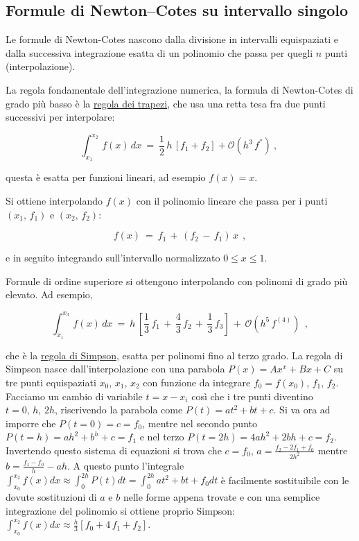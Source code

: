 \documentclass{article}
\begin{document}
	
	
	\subsection{Formule di Newton–Cotes su intervallo singolo}
	
	Le formule di Newton-Cotes nascono dalla divisione in intervalli equispaziati e dalla successiva integrazione esatta di un polinomio che passa per quegli $n$ punti (interpolazione).
	
	La regola fondamentale dell'integrazione numerica, la formula di Newton-Cotes di grado più basso è la \underline{regola dei trapezi}, che usa una retta tesa fra due punti successivi per interpolare:
	
	\begin{equation}
		\label{trapezoidal-rule}
		\int_{x_1}^{x_2}\, f(x)\, dx\ =\
		\frac{1}{2}\, h \, [f_1 + f_2] + \mathcal{O}(h^3\, f^{''})\ ,\
	\end{equation}  
	
	questa è esatta per funzioni lineari, ad esempio $f(x)=x$. 
	
	Si ottiene interpolando $f(x)$ con il polinomio lineare che passa per i punti $(x_1,\, f_1)$ e $(x_2,\, f_2)$:
	
	\[ f(x)\ =\ f_1\, +\, (f_2\, -\, f_1)\, x\ \ , \]
	
	e in seguito integrando sull'intervallo normalizzato $0 \le x \le 1$.
	
	Formule di ordine superiore si ottengono interpolando con polinomi di grado più elevato. Ad esempio,
	
	\begin{equation}\label{Simpson's rule}
		\int_{x_1}^{x_3}\, f(x)\, dx\ =\ h\, \left[
		\frac{1}{3}\, f_1\, +\, \frac{4}{3}\, f_2\, +\, \frac{1}{3}\, f_3\right]\, +\,	\mathcal{O}(h^5\, f^{(4)})\ \ ,
	\end{equation} 
	
	che è la \underline{regola di Simpson}, esatta per polinomi fino al terzo grado.
	La regola di Simpson nasce dall'interpolazione con una parabola $P(x)=Ax^x + Bx+C$ su tre punti equispaziati $x_0$, $x_1$, $x_2$ con funzione da integrare $f_0=f(x_0)$, $f_1$, $f_2$. Facciamo un cambio di variabile $t=x-x_i$ così che i tre punti diventino $t=0,\, h,\, 2h$, riscrivendo la parabola come $P(t)=at^2+bt+c$. Si va ora ad imporre che $P(t=0)=c=f_0$, mentre nel secondo punto $P(t=h)=ah^2+b^h+c=f_1$ e nel terzo $P(t=2h)=4ah^2+2bh+c=f_2$. Invertendo questo sistema di equazioni si trova che $c=f_0$, $a=\frac{f_2-2f_1+f_0}{2h^2}$ mentre $b=\frac{f_1-f_0}{h}-ah$.
	A questo punto l'integrale $\int_{x_0}^{x_2} f(x) dx\approx \int_0^{2h} P(t) dt= \int_0^{2h} at^2+bt+f_0 dt$ è facilmente sostituibile con le dovute sostituzioni di $a$ e $b$ nelle forme appena trovate e con una semplice integrazione del polinomio si ottiene proprio Simpson: $\int_{x_0}^{x_2} f(x) dx\approx \frac{h}{3} [f_0 + 4\,f_1 + f_2]$.
	
\end{document}

